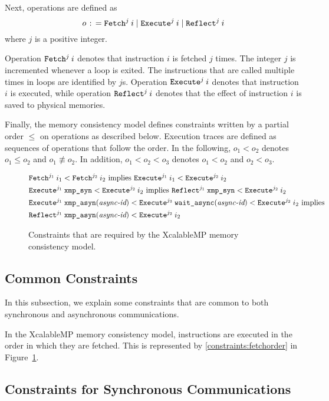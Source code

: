 Next, operations are defined as
\[
o \mathrel{\colon\!=} \texttt{Fetch}^{j} \: {i} \mid \texttt{Execute}^{j} \: {i} \mid \texttt{Reflect}^{j} \: {i}
\]
where $j$ is a positive integer.

Operation $\texttt{Fetch}^{j} \: {i}$ denotes that instruction $i$ is fetched $j$
times.  The integer $j$ is incremented whenever a loop is exited.  The
instructions that are called multiple times in loops are identified by
$j$s.  Operation $\texttt{Execute}^{j} \: {i}$ denotes that instruction $i$ is executed,
while operation $\texttt{Reflect}^{j} \: {i}$ denotes that the effect of instruction $i$
is saved to physical memories.

Finally, the memory consistency model defines constraints written by a
partial order $\leq$ on operations as described below.  Execution
traces are defined as sequences of operations that follow the order.
In the following, $o_1 < o_2$ denotes $o_1 \leq o_2$ and $o_1
\not\equiv o_2$.  In addition, $o_1 < o_2 < o_3$ denotes $o_1 < o_2$
and $o_2 < o_3$.

{
\renewcommand{\theequation}{\roman{equation}}
\begin{figure}[htbp]
\begin{align}
& \texttt{Fetch}^{j_1} \: {i_1} < \texttt{Fetch}^{j_2} \: {i_2} \mbox{ implies } \texttt{Execute}^{j_1} \: {i_1} < \texttt{Execute}^{j_2} \: {i_2} \label{constraints:fetchorder}\\
& \texttt{Execute}^{j_1} \: {\texttt{xmp\_syn}} < \texttt{Execute}^{j_2} \: {i_2} \mbox{ implies } \texttt{Reflect}^{j_1} \: {\texttt{xmp\_syn}} < \texttt{Execute}^{j_2} \: {i_2} \label{constraints:synchronous}\\
& \texttt{Execute}^{j_1} \: {\texttt{xmp\_asyn}(\textit{async-id})} < \texttt{Execute}^{j_3} \: {\texttt{wait\_async}(\textit{async-id})} < \texttt{Execute}^{j_2} \: {i_2} \mbox{ implies} \nonumber\\
& \texttt{Reflect}^{j_1} \: {\texttt{xmp\_asyn}(\textit{async-id})} < \texttt{Execute}^{j_2} \: {i_2} \label{constraints:asynchronous}
\end{align}
\caption{Constraints that are required by the XcalableMP memory consistency model.}\label{fig:constraints}
\end{figure}
}

\subsection{Common Constraints}

In this subsection, we explain some constraints that are common to both
synchronous and asynchronous communications.

In the XcalableMP memory consistency model, instructions are executed in
the order in which they are fetched.  This is represented by
\ref{constraints:fetchorder} in Figure~\ref{fig:constraints}.

\subsection{Constraints for Synchronous Communications}

